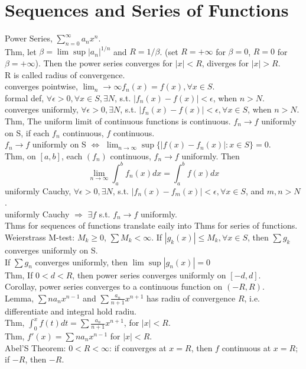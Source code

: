 \documentclass[paper=a4, fontsize=11pt]{scrartcl} %
\numberwithin{equation}{section} %
\numberwithin{figure}{section} %
\numberwithin{table}{section} %
\begin{document}
\section{Sequences and Series of Functions}
Power Series, $\sum_{n=0}^\infty a_n x^n$.\\
Thm, let $\beta= \lim\sup |a_n|^{1/n}$ and $R=1/\beta$. (set $R=+\infty$ for $\beta=0$, $R=0$ for $\beta=+\infty$). Then the power series converges for $|x|<R$, diverges for $|x|>R$.\\
R is called radius of convergence.\\
converges pointwise, $\lim_{n}\rightarrow\infty f_n(x)=f(x), \forall x\in S$.\\
formal def, $\forall \epsilon>0, \forall x\in S, \exists N$, s.t. $|f_n(x)-f(x)|<\epsilon$, when $n>N$.\\
converges uniformly, $\forall \epsilon>0, \exists N$, s.t. $|f_n(x)-f(x)|<\epsilon, \forall x\in S$, when $n>N$.\\
Thm, The uniform limit of continuous functions is continuous. $f_n\rightarrow f$ uniformly on S, if each $f_n$ continuous, $f$ continuous.\\
$f_n\rightarrow f$ uniformly on S  $\Leftrightarrow$ $\lim_{n\rightarrow\infty} \sup\{|f(x)-f_n(x)|:x\in S\} = 0$.\\
Thm, on $[a,b]$, each $(f_n)$ continuous, $f_n\rightarrow f$ uniformly. Then
\begin{equation}
\lim_{n\rightarrow \infty}\int_a^b f_n(x) dx = \int_a^b f(x) dx
\end{equation}
uniformly Cauchy, $\forall\epsilon>0, \exists N$, s.t. $|f_n(x)-f_m(x)|<\epsilon, \forall x\in S$, and $m,n>N$.\\
uniformly Cauchy $\Rightarrow$ $\exists f$ s.t. $f_n\rightarrow f$ uniformly.\\
Thms for sequences of functions translate eaily into Thms for series of functions.\\
Weierstrass M-test: $M_k\geq 0$, $\sum M_k<\infty$. If $|g_k(x)|\leq M_k,\forall x\in S$, then $\sum g_k$ converges uniformly on S.\\
If $\sum g_n$ converges uniformly, then $\lim\sup|g_n(x)| = 0$\\
Thm, If $0<d<R$, then power series converges uniformly on $[-d,d]$.\\
Corollay, power series converges to a continuous function on $(-R, R)$.\\
Lemma, $\sum na_nx^{n-1}$ and $\sum \frac{a_n}{n+1} x^{n+1}$ has radiu of convergence $R$, i.e. differentiate and integral hold radiu.\\
Thm, $\int_0^x f(t)dt = \sum \frac{a_n}{n+1} x^{n+1} $, for $|x|<R$.\\
Thm, $f'(x) = \sum na_nx^{n-1}$ for $|x|<R$.\\
Abel'S Theorem: $0<R<\infty$: if converges at $x=R$, then $f$ continuous at $x=R$; if $-R$, then $-R$.\\
\end{document}

